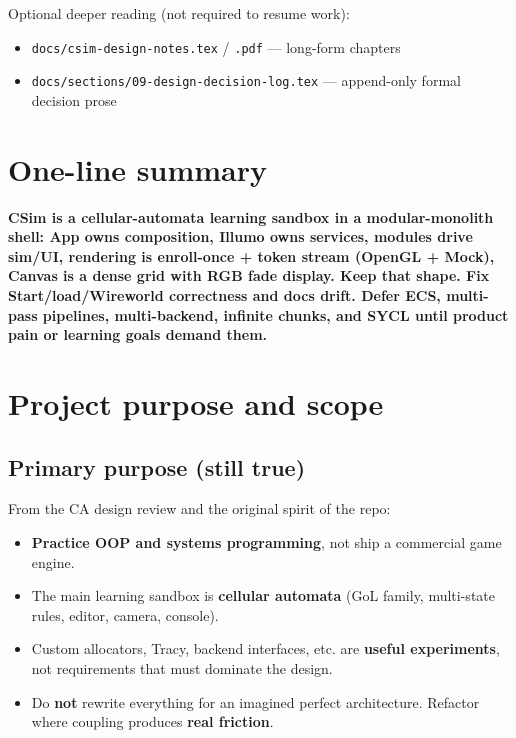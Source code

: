 \documentclass[10pt,a4paper]{article}
\begin{document}
\noindent Optional deeper reading (not required to resume work):
\begin{itemize}
    \item \texttt{docs/csim-design-notes.tex} / \texttt{.pdf} --- long-form chapters
    \item \texttt{docs/sections/09-design-decision-log.tex} --- append-only formal decision prose
\end{itemize}

\vspace{0.5em}
\tableofcontents
\newpage

\section{One-line summary}
\textbf{CSim is a cellular-automata learning sandbox in a modular-monolith shell: App owns composition, Illumo owns services, modules drive sim/UI, rendering is enroll-once + token stream (OpenGL + Mock), Canvas is a dense grid with RGB fade display. Keep that shape. Fix Start/load/Wireworld correctness and docs drift. Defer ECS, multi-pass pipelines, multi-backend, infinite chunks, and SYCL until product pain or learning goals demand them.}

\section{Project purpose and scope}

\subsection{Primary purpose (still true)}
From the CA design review and the original spirit of the repo:
\begin{itemize}
    \item \textbf{Practice OOP and systems programming}, not ship a commercial game engine.
    \item The main learning sandbox is \textbf{cellular automata} (GoL family, multi-state rules, editor, camera, console).
    \item Custom allocators, Tracy, backend interfaces, etc. are \textbf{useful experiments}, not requirements that must dominate the design.
    \item Do \textbf{not} rewrite everything for an imagined perfect architecture. Refactor where coupling produces \textbf{real friction}.
\end{itemize}
\end{document}
